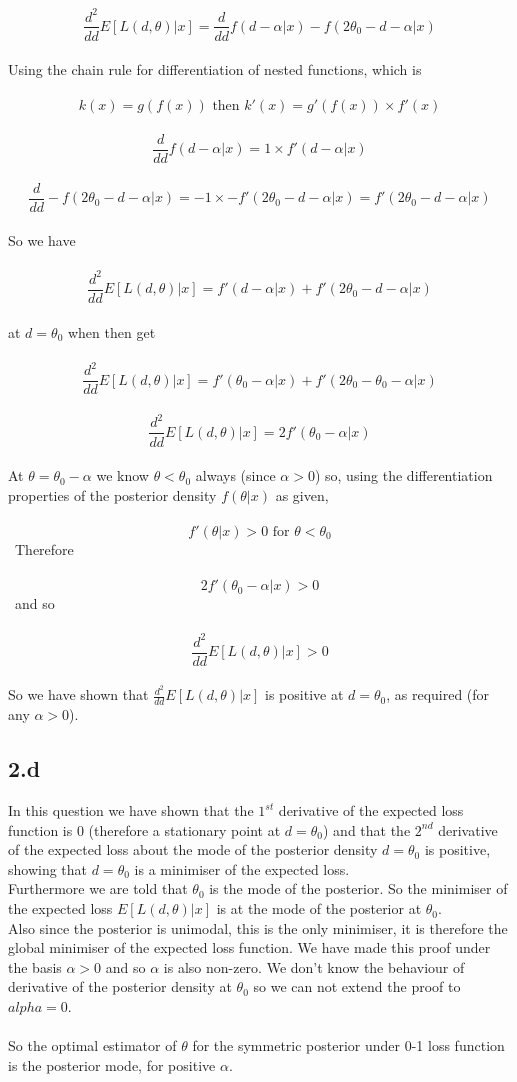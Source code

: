 \documentclass[11pt]{article}   	%
\begin{document}
\[ \frac{d^2}{dd} E[ L(d, \theta) | x ] = \frac{d}{dd} f(d - \alpha | x) - f( 2 \theta_0 - d - \alpha | x) \]
\\
Using the chain rule for differentiation of nested functions, which is \\
\
\[ k(x) = g(f(x)) \text{ then } k'(x) = g' ( f(x) ) \times f'(x)  \]
\
\[ \frac{d}{dd} f(d - \alpha | x)  = 1 \times f'(d - \alpha | x) \]
\
\[ \frac{d}{dd} -f(2 \theta_0 - d - \alpha | x) = -1 \times - f'(2 \theta_0 - d - \alpha | x) = f'(2 \theta_0 - d - \alpha | x) \]
\\
So we have \\
\
\[ \frac{d^2}{dd} E[ L(d, \theta) | x ] = f'(d - \alpha | x) + f'( 2 \theta_0 - d - \alpha | x) \]
\\
at $ d = \theta_0 $ when then get \\
\
\[ \frac{d^2}{dd} E[ L(d, \theta) | x ] = f'(\theta_0 - \alpha | x) + f'( 2 \theta_0 - \theta_0 - \alpha | x) \]
\
\[ \frac{d^2}{dd} E[ L(d, \theta) | x ] = 2f'(\theta_0 - \alpha | x) \]
\\
At $ \theta = \theta_0 - \alpha $ we know $ \theta < \theta_0 $ always (since $ \alpha > 0 $) so, using the differentiation properties of the posterior density $ f(\theta|x) $ as given, \\
\
\[ f'(\theta | x) > 0 \text{ for } \theta < \theta_0 \]
\
Therefore \\
\
\[ 2 f'(\theta_0 - \alpha | x) > 0 \]
\
and so \\
\
\[ \frac{d^2}{dd} E[ L(d, \theta) | x ] > 0 \]
\\
So we have shown that $ \frac{d^2}{dd} E[ L(d, \theta) | x ] $ is positive at $ d = \theta_0 $, as required (for any $ \alpha > 0 $).\\


\subsection*{2.d}

In this question we have shown that the $ 1^{st} $ derivative of the expected loss function is 0 (therefore a stationary point at $ d = \theta_0 $) and that the $ 2^{nd} $ derivative of the expected loss about the mode of the posterior density $ d = \theta_0 $ is positive, showing that $ d = \theta_0 $ is a minimiser of the expected loss. \\
Furthermore we are told that $ \theta_0 $ is the mode of the posterior. So the minimiser of the expected loss $ E[L(d, \theta) | x] $ is at the mode of the posterior at $ \theta_0. $ \\
Also since the posterior is unimodal, this is the only minimiser, it is therefore the global minimiser of the expected loss function. We have made this proof under the basis $ \alpha > 0 $ and so $ \alpha $ is also non-zero. We don't know the behaviour of derivative of the posterior density at $ \theta_0 $ so we can not extend the proof to $ alpha = 0 $. \\
\\
So the optimal estimator of $ \theta $ for the symmetric posterior under 0-1 loss function is the posterior mode, for positive $ \alpha $. \\
\\
\end{document}
